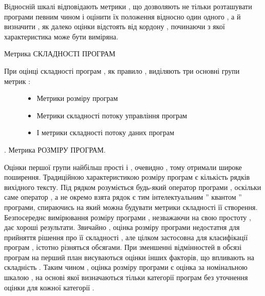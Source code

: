 \documentclass[oneside,final,14pt]{extreport}
\begin{document}
Відносній шкалі відповідають метрики , що дозволяють не тільки розташувати програми певним чином і оцінити їх положення відносно один одного , а й визначити , як далеко оцінки відстоять від кордону , починаючи з якої характеристика може бути виміряна.

Метрика СКЛАДНОСТІ ПРОГРАМ
\begin{description}
\item[{При оцінці складності програм , як правило , виділяють три основні групи метрик :}] \leavevmode\begin{itemize}
\item {} 
Метрики розміру програм

\item {} 
Метрики складності потоку управління програм

\item {} 
І метрики складності потоку даних програм

\end{itemize}

\end{description}

.
Метрика РОЗМІРУ ПРОГРАМ.

Оцінки першої групи найбільш прості і , очевидно , тому отримали широке поширення. Традиційною характеристикою розміру програм є кількість рядків вихідного тексту. Під рядком розуміється будь-який оператор програми , оскільки саме оператор , а не окремо взята рядок є тим інтелектуальним '' квантом '' програми, спираючись на який можна будувати метрики складності її створення.
Безпосереднє вимірювання розміру програми , незважаючи на свою простоту , дає хороші результати. Звичайно , оцінка розміру програми недостатня для прийняття рішення про її складності , але цілком застосовна для класифікації програм , істотно різняться обсягами. При зменшенні відмінностей в обсязі програм на перший план висуваються оцінки інших факторів, що впливають на складність . Таким чином , оцінка розміру програми є оцінка за номінальною шкалою , на основі якої визначаються тільки категорії програм без уточнення оцінки для кожної категорії .
\end{document}

